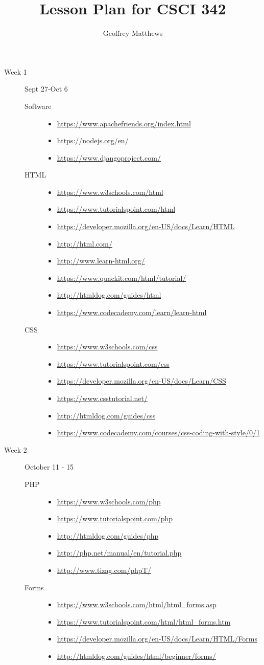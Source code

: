 \documentclass{article}
\title{Lesson Plan for CSCI 342}
\author{Geoffrey Matthews}
\newcommand{\myitem}[1]{\item{\scriptsize\url{#1}}}
\begin{document}
\maketitle
\begin{description}
\item[Week 1] Sept 27-Oct 6
\begin{description}
\item[Software]\mbox{}
  \begin{itemize}
  \myitem{https://www.apachefriends.org/index.html}
  \myitem{https://nodejs.org/en/}
  \myitem{https://www.djangoproject.com/}
  \end{itemize}

\item[HTML]\mbox{}
  \begin{itemize}
  \myitem{https://www.w3schools.com/html}
  \myitem{https://www.tutorialspoint.com/html}
  \myitem{https://developer.mozilla.org/en-US/docs/Learn/HTML}
  \myitem{http://html.com/}
  \myitem{http://www.learn-html.org/}
  \myitem{https://www.quackit.com/html/tutorial/}
  \myitem{http://htmldog.com/guides/html}
  \myitem{https://www.codecademy.com/learn/learn-html}
  \end{itemize}
  
\item[CSS]\mbox{}
  \begin{itemize}
  \myitem{https://www.w3schools.com/css}
  \myitem{https://www.tutorialspoint.com/css}
  \myitem{https://developer.mozilla.org/en-US/docs/Learn/CSS}
  \myitem{https://www.csstutorial.net/}
  \myitem{http://htmldog.com/guides/css}
  \myitem{https://www.codecademy.com/courses/css-coding-with-style/0/1}
  \end{itemize}
\end{description}


\item[Week 2] October 11 - 15
  \begin{description}
\item[PHP]\mbox{}
  \begin{itemize}
  \myitem{https://www.w3schools.com/php}
  \myitem{https://www.tutorialspoint.com/php}
  \myitem{http://htmldog.com/guides/php}
  \myitem{http://php.net/manual/en/tutorial.php}
  \myitem{http://www.tizag.com/phpT/}
  \end{itemize}

\item[Forms]\mbox{}
  \begin{itemize}
  \myitem{https://www.w3schools.com/html/html_forms.asp}
  \myitem{https://www.tutorialspoint.com/html/html_forms.htm}
  \myitem{https://developer.mozilla.org/en-US/docs/Learn/HTML/Forms}
  \myitem{http://htmldog.com/guides/html/beginner/forms/}
  \end{itemize}
  \end{description}



\end{description}
\end{document}
